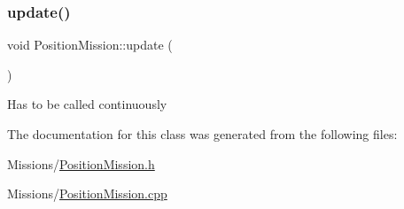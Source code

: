 \subsubsection{\texorpdfstring{update()}{update()}}
{\footnotesize\ttfamily void Position\+Mission\+::update (\begin{DoxyParamCaption}{ }\end{DoxyParamCaption})}

Has to be called continuously 

The documentation for this class was generated from the following files\+:\begin{DoxyCompactItemize}
\item 
Missions/\mbox{\hyperlink{_position_mission_8h}{Position\+Mission.\+h}}\item 
Missions/\mbox{\hyperlink{_position_mission_8cpp}{Position\+Mission.\+cpp}}\end{DoxyCompactItemize}
